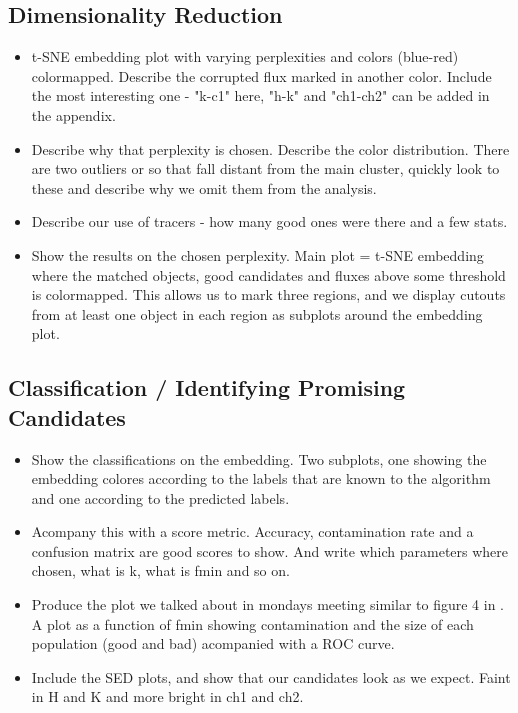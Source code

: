 \subsection{Dimensionality Reduction}
\begin{itemize}
    \item t-SNE embedding plot with varying perplexities and colors (blue-red) colormapped. Describe the corrupted flux marked in another color. Include the most interesting one - "k-c1" here, "h-k" and "ch1-ch2" can be added in the appendix.
    \item Describe why that perplexity is chosen. Describe the color distribution. There are two outliers or so that fall distant from the main cluster, quickly look to these and describe why we omit them from the analysis.
    \item Describe our use of tracers - how many good ones were there and a few stats.
    \item Show the results on the chosen perplexity. Main plot = t-SNE embedding where the matched objects, good candidates and fluxes above some threshold is colormapped. This allows us to mark three regions, and we display cutouts from at least one object in each region as subplots around the embedding plot.
\end{itemize}

\subsection{Classification / Identifying Promising Candidates}
\begin{itemize}
    \item Show the classifications on the embedding. Two subplots, one showing the embedding colores according to the labels that are known to the algorithm and one according to the predicted labels.
    \item Acompany this with a score metric. Accuracy, contamination rate and a confusion matrix are good scores to show. And write which parameters where chosen, what is k, what is fmin and so on.
    \item Produce the plot we talked about in mondays meeting similar to figure 4 in \cite{Steinhardt_2020}. A plot as a function of fmin showing contamination and the size of each population (good and bad) acompanied with a ROC curve.
    \item Include the SED plots, and show that our candidates look as we expect. Faint in H and K and more bright in ch1 and ch2.
\end{itemize}
